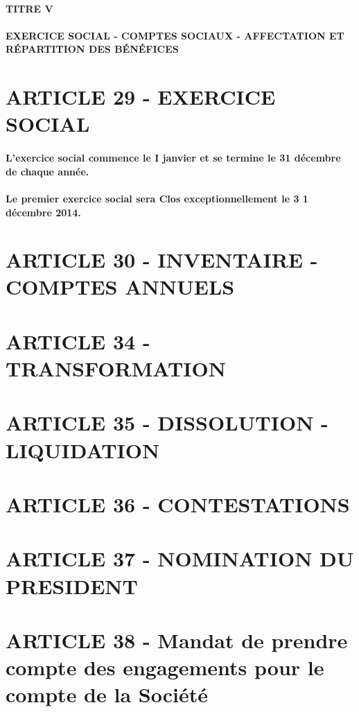 \documentclass[a4paper, 11pt]{article}
\begin{document}
\paragraph{
  TITRE V\\
  \\
  EXERCICE SOCIAL - COMPTES SOCIAUX - AFFECTATION ET RÉPARTITION DES BÉNÉFICES
}

\section*{ARTICLE 29 - EXERCICE SOCIAL}

\paragraph{
  L'exercice social commence le I janvier et se termine le 31 décembre de chaque année.
}

\paragraph{
  Le premier exercice social sera Clos exceptionnellement le 3 1 décembre 2014.
}

\section*{ARTICLE 30 - INVENTAIRE - COMPTES ANNUELS}

\section*{ARTICLE 34 - TRANSFORMATION}

\section*{ARTICLE 35 - DISSOLUTION - LIQUIDATION}

\section*{ARTICLE 36 - CONTESTATIONS}

\section*{ARTICLE 37 - NOMINATION DU PRESIDENT}

\section*{ARTICLE 38 - Mandat de prendre compte des engagements pour le compte de la Société}
\end{document}
